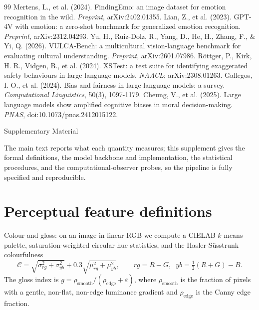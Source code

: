 \documentclass[11pt]{article}
\begin{document}
\begin{thebibliography}{99}
 Mertens, L., et al. (2024). FindingEmo: an image
dataset for emotion recognition in the wild. \emph{Preprint}, arXiv:2402.01355.
 Lian, Z., et al. (2023). GPT-4V with emotion: a
zero-shot benchmark for generalized emotion recognition. \emph{Preprint}, arXiv:2312.04293.
 Yu, H., Ruiz-Dolz, R., Yang, D., He, H., Zhang, F., \&
Yi, Q. (2026). VULCA-Bench: a multicultural vision-language benchmark for evaluating cultural
understanding. \emph{Preprint}, arXiv:2601.07986.
 R\"ottger, P., Kirk, H. R., Vidgen, B., et al.
(2024). XSTest: a test suite for identifying exaggerated safety behaviours in large language
models. \emph{NAACL}; arXiv:2308.01263.
 Gallegos, I. O., et al. (2024). Bias and
fairness in large language models: a survey. \emph{Computational Linguistics}, 50(3),
1097-1179.
 Cheung, V., et al. (2025). Large language models
show amplified cognitive biases in moral decision-making. \emph{PNAS},
doi:10.1073/pnas.2412015122.
\end{thebibliography}

\clearpage
\appendix
\renewcommand{\thesection}{S\arabic{section}}
\renewcommand{\thesubsection}{S\arabic{section}.\arabic{subsection}}
\renewcommand{\thetable}{S\arabic{table}}
\renewcommand{\thefigure}{S\arabic{figure}}
\renewcommand{\theequation}{S\arabic{equation}}
\setcounter{section}{0}\setcounter{table}{0}\setcounter{figure}{0}\setcounter{equation}{0}

\begin{center}\Large Supplementary Material\end{center}
\noindent The main text reports what each quantity measures; this supplement gives the
formal definitions, the model backbone and implementation, the statistical procedures, and
the computational-observer probes, so the pipeline is fully specified and reproducible.

\section{Perceptual feature definitions}

Colour and gloss: on an image in linear RGB we compute a CIELAB $k$-means palette,
saturation-weighted circular hue statistics, and the Hasler-S\"usstrunk colourfulness
\begin{equation}
\mathcal{C}=\sqrt{\sigma_{rg}^2+\sigma_{yb}^2}+0.3\sqrt{\mu_{rg}^2+\mu_{yb}^2},
\qquad rg=R-G,\;\; yb=\tfrac12(R+G)-B .
\end{equation}
The gloss index is $g=\rho_{\text{smooth}}/(\rho_{\text{edge}}+\varepsilon)$, where
$\rho_{\text{smooth}}$ is the fraction of pixels with a gentle, non-flat, non-edge
luminance gradient and $\rho_{\text{edge}}$ is the Canny edge fraction.
\end{document}
